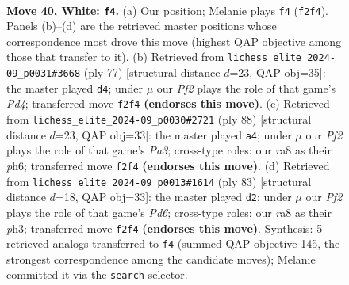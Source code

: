 \documentclass[11pt]{article}
\begin{document}
\clearpage

\begin{figure}[p]\centering
\begin{subfigure}{0.46\textwidth}\centering
\resizebox{\linewidth}{!}{%
\newchessgame
\chessboard[
  setfen={r7/8/4kp2/3p4/8/p2Q2P1/P4PKP/4q3 w - - 0 40},
  showmover=false,
  pgfstyle=straightmove, color=movearrow, markmove={f2-f4}
]}
\caption{}
\end{subfigure}\hfill
\begin{subfigure}{0.46\textwidth}\centering
\resizebox{\linewidth}{!}{%
\newchessgame
\chessboard[
  setfen={8/5pkp/3Q2p1/2Pp4/8/2q4P/5PPK/8 b - - 1 39},
  showmover=false,
  pgfstyle=straightmove, color=movearrow, markmove={d5-d4}
]}
\caption{}
\end{subfigure}
\\[4pt]
\begin{subfigure}{0.46\textwidth}\centering
\resizebox{\linewidth}{!}{%
\newchessgame
\chessboard[
  setfen={6k1/5p2/6pp/2q5/3p3P/P2Q2P1/5P1K/8 w - - 2 45},
  showmover=false,
  pgfstyle=straightmove, color=movearrow, markmove={a3-a4}
]}
\caption{}
\end{subfigure}\hfill
\begin{subfigure}{0.46\textwidth}\centering
\resizebox{\linewidth}{!}{%
\newchessgame
\chessboard[
  setfen={8/5pk1/1P4p1/7p/8/3pqP1P/6P1/3Q3K b - - 0 42},
  showmover=false,
  pgfstyle=straightmove, color=movearrow, markmove={d3-d2}
]}
\caption{}
\end{subfigure}
\caption{\textbf{Move 40, White: \texttt{f4}.} (a) Our position; Melanie plays \texttt{f4} (\texttt{f2f4}). Panels (b)--(d) are the retrieved master positions whose correspondence most drove this move (highest QAP objective among those that transfer to it). (b) Retrieved from \texttt{lichess\_elite\_2024-09\_p0031\#3668} (ply 77) [structural distance $d$=23, QAP obj=35]: the master played \texttt{d4}; under $\mu$ our \emph{Pf2} plays the role of that game's \emph{Pd4}; transferred move \texttt{f2f4} \textbf{(endorses this move)}. (c) Retrieved from \texttt{lichess\_elite\_2024-09\_p0030\#2721} (ply 88) [structural distance $d$=23, QAP obj=33]: the master played \texttt{a4}; under $\mu$ our \emph{Pf2} plays the role of that game's \emph{Pa3}; cross-type roles: our \emph{r}a8 as their \emph{p}h6; transferred move \texttt{f2f4} \textbf{(endorses this move)}. (d) Retrieved from \texttt{lichess\_elite\_2024-09\_p0013\#1614} (ply 83) [structural distance $d$=18, QAP obj=33]: the master played \texttt{d2}; under $\mu$ our \emph{Pf2} plays the role of that game's \emph{Pd6}; cross-type roles: our \emph{r}a8 as their \emph{p}h3; transferred move \texttt{f2f4} \textbf{(endorses this move)}. Synthesis: 5 retrieved analogs transferred to \texttt{f4} (summed QAP objective 145, the strongest correspondence among the candidate moves); Melanie committed it via the \texttt{search} selector.}
\label{fig:thought-m78}
\end{figure}
\end{document}
